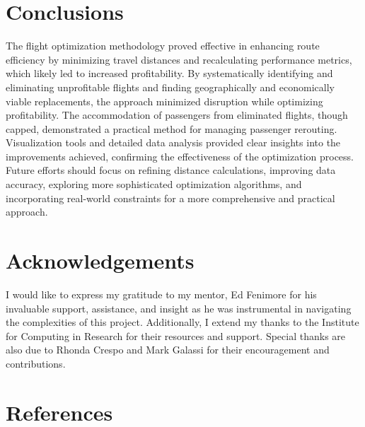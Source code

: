 \documentclass{article}
\begin{document}
\section{Conclusions}

The flight optimization methodology proved effective in enhancing route efficiency by minimizing travel distances and recalculating performance metrics, which likely led to increased profitability. By systematically identifying and eliminating unprofitable flights and finding geographically and economically viable replacements, the approach minimized disruption while optimizing profitability. The accommodation of passengers from eliminated flights, though capped, demonstrated a practical method for managing passenger rerouting. Visualization tools and detailed data analysis provided clear insights into the improvements achieved, confirming the effectiveness of the optimization process. Future efforts should focus on refining distance calculations, improving data accuracy, exploring more sophisticated optimization algorithms, and incorporating real-world constraints for a more comprehensive and practical approach.

\section*{Acknowledgements}

I would like to express my gratitude to my mentor, Ed Fenimore for his invaluable support, assistance, and insight as he was instrumental in navigating the complexities of this project. Additionally, I extend my thanks to the Institute for Computing in Research for their resources and support. Special thanks are also due to Rhonda Crespo and Mark Galassi for their encouragement and contributions.

\newpage

\section*{\centering References}
\end{document}
